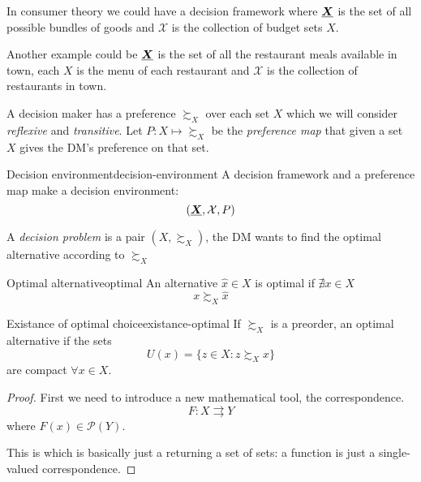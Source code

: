\documentclass[12pt]{extarticle}
\renewcommand{\vec}[1]{\uvec{#1}}
\begin{document}
In consumer theory we could have a decision framework where $\vec X$ is the set of all possible bundles of goods and $\mathcal X$ is the collection of budget sets $X$.

Another example could be $\vec X$ is the set of all the restaurant meals available in town, each $X$ is the menu of each restaurant and $\mathcal X$ is the collection of restaurants in town.

A decision maker has a preference $\succsim_X$ over each set $X$ which we will consider \emph{reflexive} and \emph{transitive}.
Let $P: X \mapsto \succsim_X$ be the \emph{preference map} that given a set $X$ gives the DM's preference on that set.

\begin{definition}{Decision environment}{decision-environment}
    A decision framework and a preference map make a decision environment:
    \begin{equation}
        (\vec X, \mathcal X, P)
    \end{equation}
\end{definition}

A \emph{decision problem} is a pair $(X, \succsim_X)$, the DM wants to find the optimal alternative according to $\succsim_X$

\begin{definition}{Optimal alternative}{optimal}
    An alternative $\hat x \in X$ is optimal if $\nexists x \in X$
    \begin{equation}
        x \succsim_X \hat  x
    \end{equation}
\end{definition}

\begin{theorem}{Existance of optimal choice}{existance-optimal}
    If $\succsim_X$ is a preorder, an optimal alternative if the sets
    \begin{equation}
        U(x) = \{ z \in X : z \succsim_X x \}
    \end{equation}
    are compact $\forall x \in X$.
\end{theorem}

\begin{proof}
    First we need to introduce a new mathematical tool, the correspondence.
    \begin{equation}
        F:X  \rightrightarrows Y
    \end{equation}
    where $F(x) \in \mathcal P(Y)$.

    This is which is basically just a  returning a set of sets: a function is just a single-valued correspondence.

\end{proof}
\end{document}
